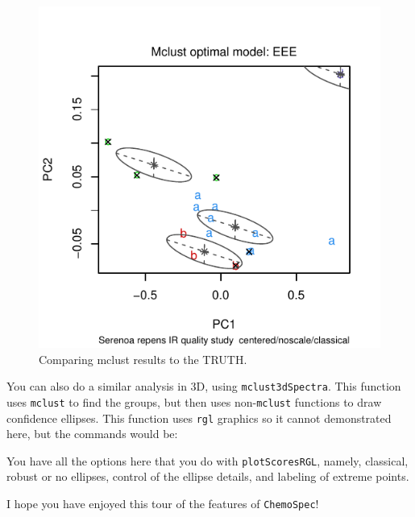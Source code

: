 \documentclass[letter,10pt,twocolumn,twoside,printwatermark=false]{pinp}
\begin{document}
\begin{figure}

{\centering \includegraphics{ChemoSpec2_files/figure-latex/Chunk37-1} 

}

\caption{\label{mclust3}Comparing mclust results to the TRUTH.}\label{fig:Chunk37}
\end{figure}

You can also do a similar analysis in 3D, using
\texttt{mclust3dSpectra}. This function uses \texttt{mclust} to find the
groups, but then uses non-\texttt{mclust} functions to draw confidence
ellipses. This function uses \texttt{rgl} graphics so it cannot
demonstrated here, but the commands would be:

\begin{Shaded}
\begin{Highlighting}[]
\end{Highlighting}
\end{Shaded}

You have all the options here that you do with \texttt{plotScoresRGL},
namely, classical, robust or no ellipses, control of the ellipse
details, and labeling of extreme points.

I hope you have enjoyed this tour of the features of \texttt{ChemoSpec}!
\end{document}
